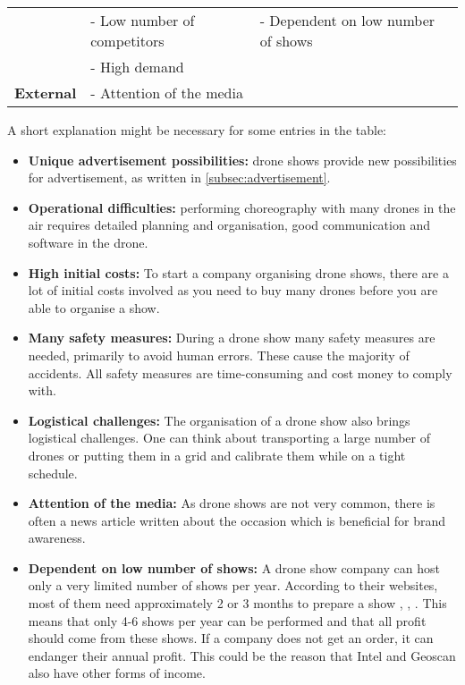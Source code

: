 \begin{table}[h]
\begin{small}
\begin{tabular}{|c|l|l|}
                           & - Low number of competitors                         &     - Dependent on low number of shows                                        \\
                           & - High demand                                       &                                             \\
\multirow{-7}{*}{\textbf{External}} & - Attention of the media                            &                                             \\ \hline
\end{tabular}
\end{small}
\end{table}

A short explanation might be necessary for some entries in the table:

\begin{itemize}[noitemsep, nolistsep]
\item \textbf{Unique advertisement possibilities:} drone shows provide new possibilities for advertisement, as written in \autoref{subsec:advertisement}.
\item \textbf{Operational difficulties:} performing choreography with many drones in the air requires detailed planning and organisation, good communication and software in the drone.
\item \textbf{High initial costs:} To start a company organising drone shows, there are a lot of initial costs involved as you need to buy many drones before you are able to organise a show.
\item \textbf{Many safety measures:} During a drone show many safety measures are needed, primarily to avoid human errors. These cause the majority of accidents. All safety measures are time-consuming and cost money to comply with. 
\item \textbf{Logistical challenges:} The organisation of a drone show also brings logistical challenges. One can think about transporting a large number of drones or putting them in a grid and calibrate them while on a tight schedule.
\item \textbf{Attention of the media:} As drone shows are not very common, there is often a news article written about the occasion which is beneficial for brand awareness.
\item \textbf{Dependent on low number of shows:} A drone show company can host only a very limited number of shows per year. According to their websites, most of them need approximately 2 or 3 months to prepare a show \cite{intel}, \cite{anymotion},  \cite{geoscan}. This means that only 4-6 shows per year can be performed and that all profit should come from these shows. If a company does not get an order, it can endanger their annual profit. This could be the reason that Intel \cite{intel} and Geoscan \cite{geoscan} also have other forms of income.
\end{itemize}

